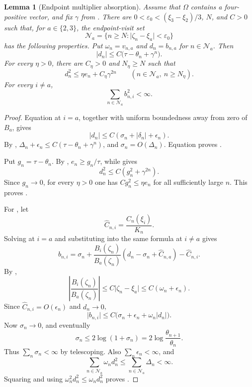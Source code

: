 \documentclass[11pt]{article}
\newtheorem{lemma}{Lemma}[section]
\begin{document}
\begin{lemma}[Endpoint multiplier absorption]
\label{lem:endpoint-errors}
Assume that \(\Omega\) contains a four-positive vector, and fix
\(\gamma\) from .  There are
\(0<\varepsilon_0<(\xi_3-\xi_2)/3\), \(N\), and \(C>0\) such that, for
\(a\in\{2,3\}\), the endpoint-visit set
\[
 \mathcal N_a
 =\{n\geq N:\lvert\zeta_n-\xi_a\rvert<\varepsilon_0\}
\]
has the following properties.  Put
\(\omega_n=v_{n,a}\) and \(d_n=b_{n,a}\) for \(n\in\mathcal N_a\).
Then
\[
 \lvert d_n\rvert
 \leq C\bigl(\tau-\theta_n+\gamma^n\bigr).
\tag{51}\label{eq:d-tail}
\]
For every \(\eta>0\), there are \(C_\eta>0\) and \(N_\eta\geq N\) such
that
\[
 d_n^2\leq\eta e_n+C_\eta\gamma^{2n}
 \qquad(n\in\mathcal N_a,\ n\geq N_\eta).
\tag{52}\label{eq:d-absorbed}
\]
For every \(i\neq a\),
\[
 \sum_{n\in\mathcal N_a}b_{n,i}^2<\infty.
\tag{53}\label{eq:other-errors-summable}
\]
\end{lemma}

\begin{proof}
Equation  at \(i=a\), together with
uniform boundedness away from zero of \(B_a\), gives
\[
 \lvert d_n\rvert
 \leq C(\sigma_n+\lvert\delta_n\rvert+\epsilon_n).
\tag{54}\label{eq:d-basic}
\]
By ,
\(\Delta_n+\epsilon_n\leq
C(\tau-\theta_n+\gamma^n)\), and
\(\sigma_n=O(\Delta_n)\).  Equation  proves
.

Put \(g_n=\tau-\theta_n\).  By ,
\(e_n\geq g_n/\tau\), while  gives
\[
 d_n^2\leq C(g_n^2+\gamma^{2n}).
\]
Since \(g_n\to0\), for every \(\eta>0\) one has
\(Cg_n^2\leq\eta e_n\) for all sufficiently large \(n\).  This proves
.

For , let
\[
 \widehat C_{n,i}=\frac{C_n(\xi_i)}{K_n}.
\]
Solving  at \(i=a\) and substituting
into the same formula at \(i\neq a\) gives
\[
 b_{n,i}
 =\sigma_n+
 \frac{B_i(\zeta_n)}{B_a(\zeta_n)}
   (d_n-\sigma_n+\widehat C_{n,a})
 -\widehat C_{n,i}.
\tag{55}\label{eq:other-error-exact}
\]
By ,
\[
 \left\lvert\frac{B_i(\zeta_n)}{B_a(\zeta_n)}\right\rvert
 \leq C\lvert\zeta_n-\xi_a\rvert
 \leq C(\omega_n+\epsilon_n).
\tag{56}\label{eq:B-ratio}
\]
Since \(\widehat C_{n,i}=O(\epsilon_n)\) and \(d_n\to0\),
\[
 \lvert b_{n,i}\rvert
 \leq C\bigl(\sigma_n+\epsilon_n+\omega_n\lvert d_n\rvert\bigr).
\tag{57}\label{eq:other-error-bound}
\]
Now \(\sigma_n\to0\), and eventually
\[
 \sigma_n\leq2\log(1+\sigma_n)
 =2\log\frac{\theta_{n+1}}{\theta_n}.
\]
Thus \(\sum_n\sigma_n<\infty\) by telescoping.  Also
\(\sum_n\epsilon_n<\infty\), and
\[
 \sum_{n\in\mathcal N_a}\omega_nd_n^2
 \leq\sum_{n\in\mathcal N_a}\Delta_n<\infty.
\]
Squaring  and using
\(\omega_n^2d_n^2\leq\omega_nd_n^2\) proves
.
\end{proof}
\end{document}
